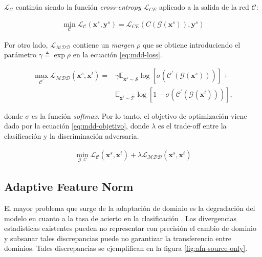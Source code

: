 $\mathcal{L}_{\mathcal{C}}$ continúa siendo la función {\it cross-entropy} $\mathcal{L}_{CE}$ aplicado a la salida de la red $\mathcal{C}$:

\begin{align}
  \min_{\mathcal{C}} \mathcal{L}_\mathcal{C}(\mathbf{x}^s, \mathbf{y}^s) = \mathcal{L}_{CE}(C(\mathcal{G}(\mathbf{x}^s)), \mathbf{y}^s)
  \label{eq:mdd-loss-clasificadora}
\end{align}

Por otro lado, $\mathcal{L}_{\mathcal{MDD}}$ contiene un {\it margen} $\rho$ que se obtiene introduciendo el parámetro
$\gamma \triangleq \exp \rho$ en la ecuación \ref{eq:mdd-loss}.

\begin{align}
  \max_{\mathcal{C}^{'}} \mathcal{L}_{\mathcal{MDD}}(\mathbf{x}^s, \mathbf{x}^t) = & \gamma \mathbb{E}_{\mathbf{x}^s \sim \mathcal{\hat{S}}} \log[\sigma(\mathcal{C}^{'}(\mathcal{G}(\mathbf{x}^s)))] + \nonumber \\
                                                                                   & \mathbb{E}_{\mathbf{x}^t \sim \mathcal{\hat{T}}} \log[1-\sigma(\mathcal{C}^{'}(\mathcal{G}(\mathbf{x}^t)))],
  \label{eq:mdd-loss}
\end{align}

\noindent
donde $\sigma$ es la función {\it softmax}. Por lo tanto, el objetivo de optimización viene dado por la ecuación
\ref{eq:mdd-objetivo}, donde $\lambda$ es el trade-off entre la clasificación y la discriminación adversaria.

\begin{align}
  \min_{\mathcal{G}, \mathcal{C}} \mathcal{L}_{\mathcal{C}}(\mathbf{x}^s, \mathbf{x}^t) + \lambda \mathcal{L}_{\mathcal{MDD}}(\mathbf{x}^s, \mathbf{x}^t)
  \label{eq:mdd-objetivo}
\end{align}

\subsection{Adaptive Feature Norm}

El mayor problema que surge de la adaptación de dominio es la degradación del modelo en cuanto a la tasa de acierto en
la clasificación \parencite{yosinski2014transferable}. Las divergencias estadísticas existentes pueden no representar con precisión el
cambio de dominio y subsanar tales discrepancias puede no garantizar la transferencia entre dominios. Tales
discrepancias se ejemplifican en la figura \ref{fig:afn-source-only}.

